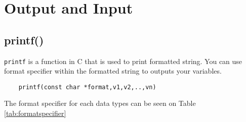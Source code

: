 \section{Output and Input}

\subsection{printf()}
\verb*|printf| is a function in C that is used to print formatted string. %
You can use format specifier within the formatted string to outputs your variables.

\begin{verbatim}
	printf(const char *format,v1,v2,..,vn)
\end{verbatim}

The format specifier for each data types can be seen on Table \ref{tab:formatspecifier}


